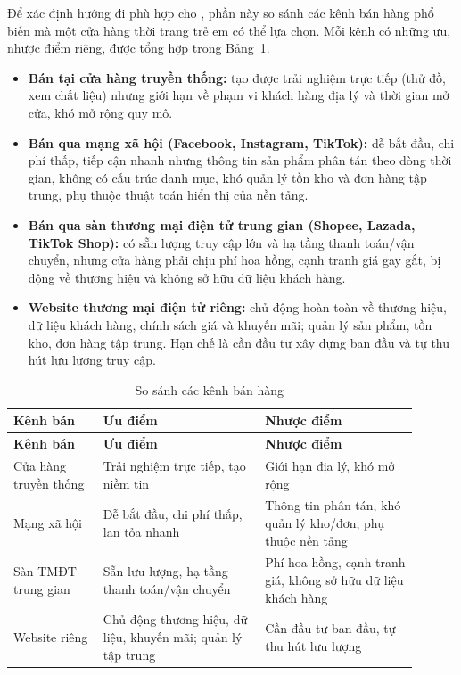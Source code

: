 Để xác định hướng đi phù hợp cho \brandName{}, phần này so sánh các kênh bán hàng phổ biến mà
một cửa hàng thời trang trẻ em có thể lựa chọn. Mỗi kênh có những ưu, nhược điểm riêng, được
tổng hợp trong Bảng~\ref{tab:channels}.

\begin{itemize}
  \item \textbf{Bán tại cửa hàng truyền thống:} tạo được trải nghiệm trực tiếp (thử đồ, xem chất
  liệu) nhưng giới hạn về phạm vi khách hàng địa lý và thời gian mở cửa, khó mở rộng quy mô.
  \item \textbf{Bán qua mạng xã hội (Facebook, Instagram, TikTok):} dễ bắt đầu, chi phí thấp,
  tiếp cận nhanh nhưng thông tin sản phẩm phân tán theo dòng thời gian, không có cấu trúc danh
  mục, khó quản lý tồn kho và đơn hàng tập trung, phụ thuộc thuật toán hiển thị của nền tảng.
  \item \textbf{Bán qua sàn thương mại điện tử trung gian (Shopee, Lazada, TikTok Shop):} có sẵn
  lượng truy cập lớn và hạ tầng thanh toán/vận chuyển, nhưng cửa hàng phải chịu phí hoa hồng,
  cạnh tranh giá gay gắt, bị động về thương hiệu và không sở hữu dữ liệu khách hàng.
  \item \textbf{Website thương mại điện tử riêng:} chủ động hoàn toàn về thương hiệu, dữ liệu khách
  hàng, chính sách giá và khuyến mãi; quản lý sản phẩm, tồn kho, đơn hàng tập trung. Hạn chế là
  cần đầu tư xây dựng ban đầu và tự thu hút lưu lượng truy cập.
\end{itemize}

\begin{longtable}{|>{\raggedright\arraybackslash}p{0.20\linewidth}|>{\raggedright\arraybackslash}p{0.36\linewidth}|>{\raggedright\arraybackslash}p{0.34\linewidth}|}
\caption{So sánh các kênh bán hàng}\label{tab:channels}\\
\hline
\rowcolor{gray!12}\textbf{Kênh bán} & \textbf{Ưu điểm} & \textbf{Nhược điểm} \\ \hline
\endfirsthead
\hline
\rowcolor{gray!12}\textbf{Kênh bán} & \textbf{Ưu điểm} & \textbf{Nhược điểm} \\ \hline
\endhead
Cửa hàng truyền thống & Trải nghiệm trực tiếp, tạo niềm tin & Giới hạn địa lý, khó mở rộng \\ \hline
Mạng xã hội & Dễ bắt đầu, chi phí thấp, lan tỏa nhanh & Thông tin phân tán, khó quản lý kho/đơn, phụ thuộc nền tảng \\ \hline
Sàn TMĐT trung gian & Sẵn lưu lượng, hạ tầng thanh toán/vận chuyển & Phí hoa hồng, cạnh tranh giá, không sở hữu dữ liệu khách hàng \\ \hline
Website riêng & Chủ động thương hiệu, dữ liệu, khuyến mãi; quản lý tập trung & Cần đầu tư ban đầu, tự thu hút lưu lượng \\ \hline
\end{longtable}

